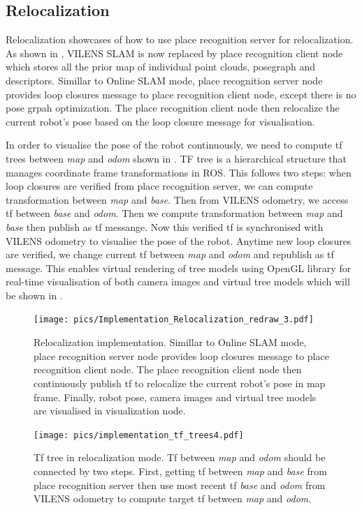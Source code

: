 \subsection{Relocalization}
Relocalization showcases of how to use place recognition server for relocalization. As shown in , VILENS SLAM is now replaced by place recognition client node which stores all the prior map of individual point clouds, posegraph and descriptors. Simillar to Online SLAM mode, place recognition server node provides loop closures message to place recognition client node, except there is no pose grpah optimization. The place recognition client node then relocalize the current robot's pose based on the loop closure message for visualisation. 

In order to visualise the pose of the robot continuously, we need to compute tf trees between \emph{map} and \emph{odom} shown in . TF tree is a hierarchical structure that manages coordinate frame transformations in ROS. This follows two steps: when loop closures are verified from place recognition server, we can compute transformation between \emph{map} and \emph{base}. Then from VILENS odometry, we access tf between \emph{base} and \emph{odom}. Then we compute transformation between \emph{map} and \emph{base} then publish as tf messange. Now this verified tf is synchronised with VILENS odometry to visualise the pose of the robot. Anytime new loop closures are verified, we change current tf between \emph{map} and \emph{odom} and republish as tf message. 
This enables virtual rendering of tree models using OpenGL library for real-time visualisation of both camera images and virtual tree models which will be shown in . 

\begin{figure}[htbp]
  \centering
  \texttt{[image: pics/Implementation\_Relocalization\_redraw\_3.pdf]}
  \caption{Relocalization implementation. Simillar to Online SLAM mode, place recognition server node provides loop closures message to place recognition client node. The place recognition client node then continuously publish tf to relocalize the current robot's pose in map frame. Finally, robot pose, camera images and virtual tree models are visualised in visualization node.}
  \label{fig:implementation_relocalization}
\end{figure}



\begin{figure}[htbp]
  \centering
  \texttt{[image: pics/implementation\_tf\_trees4.pdf]}
  \caption{Tf tree in relocalization mode. Tf between \emph{map} and \emph{odom} should be connected by two steps. First, getting tf between \emph{map} and \emph{base} from place recognition server then use most recent tf \emph{base} and \emph{odom} from VILENS odometry to compute target tf between \emph{map} and \emph{odom}.}  
  \label{fig:implementation_relocalization_tf}
\end{figure}